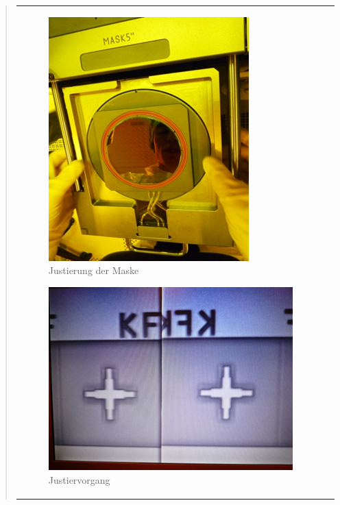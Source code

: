 \begin{quote}
\begin{center}
\begin{tabular}{ll}
                \hspace{-14em}
                    \begin{minipage}{0.8\textwidth}
                        \begin{figure}[H]
                        \hspace{7em}
                            \includegraphics[scale=1.0, trim = 0cm 0cm 0cm
                            0cm, clip]{./HerstellungBilder/Maskenjustierer.png}
                            \caption{Justierung der Maske}
                           \label{fig:just}
                        \end{figure}

                    \end{minipage}
                    \begin{minipage}{0.4\textwidth}

                        \begin{figure}[H]
                        \hspace{-6em}
                            \includegraphics[scale=0.9, trim = 0cm 0cm 0cm
                            0cm, clip]
                            {./HerstellungBilder/Justiervorgang.png}
                            \caption{Justiervorgang}
                           \label{fig:Justiervorgang}
                        \end{figure}
                    \vspace{-1.5em}


\end{minipage}
\end{tabular}
\end{center}
\end{quote}
